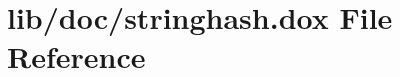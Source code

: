 \hypertarget{stringhash_8dox}{\section{lib/doc/stringhash.dox File Reference}
\label{stringhash_8dox}
}
